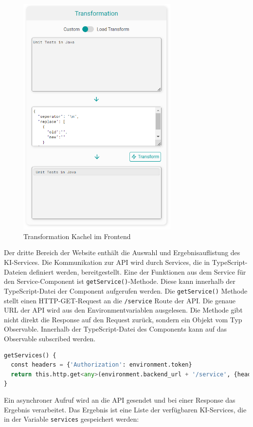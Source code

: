 \begin{figure}[H]
  \centering
    \includegraphics[width = 8cm]{bilder/websiteTransformation}
    \caption{Transformation Kachel im Frontend}
\end{figure}

Der dritte Bereich der Website enthält die Auswahl und Ergebnisauflistung des KI-Services. Die Kommunikation zur API wird durch Services, die in TypeScript-Dateien definiert werden, bereitgestellt. Eine der Funktionen aus dem Service für den Service-Component ist \texttt{getService()}-Methode. Diese kann innerhalb der TypeScript-Datei der Component aufgerufen werden. Die \texttt{getService()} Methode stellt einen HTTP-GET-Request an die \texttt{/service} Route der API. Die genaue URL der API wird aus den Environmentvariablen ausgelesen. Die Methode gibt nicht direkt die Response auf den Request zurück, sondern ein Objekt vom Typ Observable. Innerhalb der TypeScript-Datei des Components kann auf das Observable subscribed werden. 

\begin{lstlisting}[language=Python, caption={Abfrage der Services}]
getServices() {
  const headers = {'Authorization': environment.token}
  return this.http.get<any>(environment.backend_url + '/service', {headers})
}
\end{lstlisting}

Ein asynchroner Aufruf wird an die API gesendet und bei einer Response das Ergebnis verarbeitet. Das Ergebnis ist eine Liste der verfügbaren KI-Services, die in der Variable \texttt{services} gespeichert werden:

